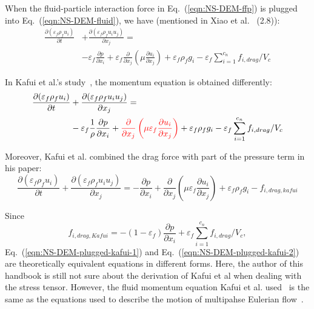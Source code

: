 \documentclass[11pt]{article}
\begin{document}
When the fluid-particle interaction force in Eq.~(\ref{eqn:NS-DEM-ffp}) is plugged into
Eq.~(\ref{eqn:NS-DEM-fluid}), we have (mentioned in Xiao et al.~\cite{xiao11ai} (2.8)):
\begin{equation}
  \begin{split}
  \frac{\partial (\varepsilon_f \rho_f u_i)}{\partial t}
  &+\frac{\partial (\varepsilon_f \rho_f u_i u_j)}{\partial x_j} = \\
  &- \varepsilon_f \frac{\partial p}{\partial x_i}
   + \varepsilon_f \frac{\partial}{\partial x_j}\left(\mu \frac{\partial u_i}{\partial x_j}\right)
   + \varepsilon_f \rho_f g_i
   - \varepsilon_f \sum\limits_{i=1}^{c_n}f_{i,drag}/V_c 
  \end{split}
\label{eqn:NS-DEM-plugged-xiao}
\end{equation}

In Kafui et al.'s study~\cite{kafui02dp}, the momentum equation is obtained differently:
\begin{equation}
  \begin{split}
  \frac{\partial (\varepsilon_f \rho_f u_i)}{\partial t}
  &+\frac{\partial (\varepsilon_f \rho_f u_i u_j)}{\partial x_j} = \\
  &- \varepsilon_f \frac{1}{\rho}\frac{\partial p}{\partial x_i}
  + {\color{red}\frac{\partial}{\partial x_j}\left(\mu \varepsilon_f \frac{\partial u_i}{\partial
  x_j}\right)}
   + \varepsilon_f \rho_f g_i
   - \varepsilon_f \sum\limits_{i=1}^{c_n}f_{i,drag}/V_c 
  \end{split}
\label{eqn:NS-DEM-plugged-kafui-1}
\end{equation}

Moreover, Kafui et al. combined the drag force with part of the pressure term in his paper:
\begin{equation}
  \frac{\partial (\varepsilon_f \rho_f u_i)}{\partial t}
  +\frac{\partial (\varepsilon_f \rho_f u_i u_j)}{\partial x_j} = 
  - \frac{\partial p}{\partial x_i}
  + \frac{\partial}{\partial x_j}\left(\mu \varepsilon_f \frac{\partial u_i}{\partial x_j}\right)
  + \varepsilon_f \rho_f g_i
  - f_{i,drag,kafui}
\label{eqn:NS-DEM-plugged-kafui-2}
\end{equation}

Since 
\begin{equation}
  f_{i,drag,Kafui} = 
  - (1-\varepsilon_f) \frac{\partial p}{\partial x_i}
  + \varepsilon_f \sum\limits_{i=1}^{c_n}f_{i,drag}/V_c,
\label{eqn:NS-DEM-plugged-kafui}
\end{equation}
Eq.~(\ref{eqn:NS-DEM-plugged-kafui-1}) and Eq.~(\ref{eqn:NS-DEM-plugged-kafui-2}) are theoretically
equivalent equations in different forms. Here, the author of this handbook is still not sure about
the derivation of Kafui et al when dealing with the stress tensor. However, the fluid momentum
equation Kafui et al.  used~\cite{kafui02dp} is the same as the equations used to describe the
motion of multipahse Eulerian flow~\cite{ishii75tf}. 
\end{document}
